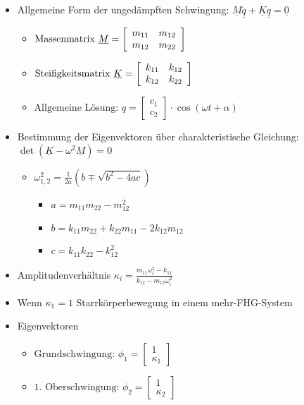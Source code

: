 \documentclass[fleqn,twoside]{article}
\begin{document}
\begin{multicols*}{3}
\begin{itemize}
\item Allgemeine Form der ungedämpften Schwingung: $\underline{M} \underline{\ddot{q}}+\underline{K} \underline{q}=\underline{0}$
\begin{itemize}
    \item $\text {Massenmatrix } \underline{M}=\left[\begin{array}{ll}
            m_{11} & m_{12} \\
            m_{12} & m_{22}
            \end{array}\right] \\$
    \item $\text {Steifigkeitsmatrix } \underline{K}=\left[\begin{array}{ll}
            k_{11} & k_{12} \\
            k_{12} & k_{22}
            \end{array}\right] \\$
    \item $\text {Allgemeine Lösung: } q=\left[\begin{array}{l}
            c_1 \\
            c_2
            \end{array}\right] \cdot \cos (\omega t+\alpha)$
\end{itemize}

\item  Bestimmung der Eigenvektoren über charakteristische Gleichung: $\operatorname{det}\left(\underline{K}-\omega^2 \underline{M}\right)=0$
\begin{itemize}
\item $\omega_{1,2}^2 =\frac{1}{2 a}\left(b \mp \sqrt{b^2-4 a c}\right)$
    \begin{itemize}
        \item $a  =m_{11} m_{22}-m_{12}^2$
        \item $b  =k_{11} m_{22}+k_{22} m_{11}-2 k_{12} m_{12}$
        \item $c  =k_{11} k_{22}-k_{12}^2$
    \end{itemize}
\end{itemize}

\item  Amplitudenverhältnis $\kappa_i=\frac{m_{11} \omega_i^2-k_{11}}{k_{12}-m_{12} \omega_i^2}$
\item  Wenn $\kappa_1=1$ Starrkörperbewegung in einem mehr-FHG-System
\item  Eigenvektoren
\begin{itemize}
\item $\text {Grundschwingung: } \phi_1=\left[\begin{array}{c}
1 \\
\kappa_1
\end{array}\right]$
\item  $\text {1. Oberschwingung: } \phi_2=\left[\begin{array}{c}
1 \\
\kappa_2
\end{array}\right]$
\end{itemize}


\end{itemize}
\end{multicols*}
\end{document}
